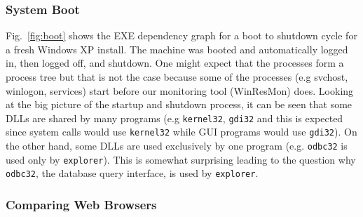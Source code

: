 \subsubsection{System Boot}
\label{sec:apply:boot}

Fig.~\ref{fig:boot} shows the EXE dependency graph for a boot to shutdown cycle
for a fresh Windows XP install.
The machine was booted and automatically logged in,
then logged off, and shutdown. One might expect that the processes
form a process tree but that is not the case because some of the processes (e.g
svchost, winlogon, services) start before our monitoring tool
(WinResMon) does. Looking at the big picture of the startup and shutdown
process, it can be seen that some DLLs are shared by many programs (e.g
{\tt kernel32}, {\tt gdi32} and this is expected since system calls would use
{\tt kernel32} while GUI programs would use {\tt gdi32}).
On the other hand, some DLLs are used exclusively by one program (e.g.
{\tt odbc32} is used only by {\tt explorer}).
This is somewhat surprising leading to the question why {\tt odbc32},
the database query interface, is used by {\tt explorer}.

\subsubsection{Comparing Web Browsers}

